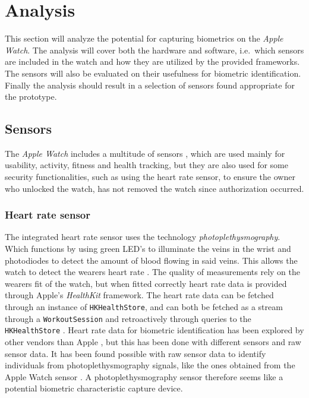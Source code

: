 \section{Analysis}
This section will analyze the potential for capturing biometrics on the
\textit{Apple Watch}. The analysis will cover both the hardware and
software, i.e.\ which sensors are included in the watch and how they are 
utilized by the provided frameworks. The sensors will also be evaluated 
on their usefulness for biometric identification. Finally the analysis 
should result in a selection of sensors found appropriate for the prototype.

\subsection{Sensors}
The \textit{Apple Watch} includes a multitude of sensors \cite{Ap16}, 
which are used mainly for usability, activity, fitness and health tracking, but
they are also used for some security functionalities, such as using the heart 
rate sensor, to ensure the owner who unlocked the watch, has not removed the 
watch since authorization occurred.

\subsubsection{Heart rate sensor}
The integrated heart rate sensor uses the technology
\textit{photoplethysmography}. Which functions by using green LED's to
illuminate the veins in the wrist and photodiodes to detect the amount of blood
flowing in said veins. This allows the watch to detect the wearers heart rate
\cite{watchheartrate}.
The quality of measurements rely on the wearers fit of the watch, but when
fitted correctly heart rate data is provided through Apple's \textit{HealthKit}
framework. The heart rate data can be fetched through an instance of
\texttt{HKHealthStore}, and can both be fetched as a stream through a
\texttt{WorkoutSession} and retroactively through queries to the
\texttt{HKHealthStore} \cite{healthkitfw}.
Heart rate data for biometric identification has been explored by other vendors
than Apple \cite{nymiwhitepaper}, but this has been done with different sensors
and raw sensor data. It has been found possible with raw sensor data to identify
individuals from photoplethysmography signals, like the ones obtained from the
Apple Watch sensor \cite{kavsaoglu2013a}. A photoplethysmography sensor
therefore seems like a potential biometric characteristic capture device.


